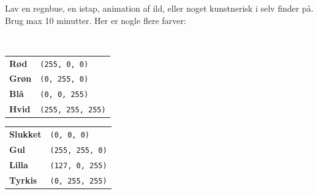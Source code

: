 \documentclass{ucph-handout}
\begin{document}
\begin{exercisebox}[adjusted title=Mini-projekt]
  Lav en regnbue, en istap, animation af ild, eller
  noget kunstnerisk i selv finder på. Brug max 10 minutter. Her er
  nogle flere farver:

  \hfill \\
  \begin{minipage}{0.45\linewidth}
    \begin{tabular}{ll}
    \textbf{Rød} & \lstinline[style=mypython]$(255, 0, 0)$ \\
    \textbf{Grøn} & \lstinline[style=mypython]$(0, 255, 0)$ \\
    \textbf{Blå} & \lstinline[style=mypython]$(0, 0, 255)$ \\
    \textbf{Hvid} & \lstinline[style=mypython]$(255, 255, 255)$ \\
    \end{tabular}
  \end{minipage}
  \begin{minipage}{0.45\linewidth}
    \begin{tabular}{ll}
    \textbf{Slukket} & \lstinline[style=mypython]$(0, 0, 0)$ \\
    \textbf{Gul} & \lstinline[style=mypython]$(255, 255, 0)$ \\
   \textbf{Lilla} & \lstinline[style=mypython]$(127, 0, 255)$ \\
    \textbf{Tyrkis} & \lstinline[style=mypython]$(0, 255, 255)$ \\
    \end{tabular}
  \end{minipage}
\end{exercisebox}


\end{document}
